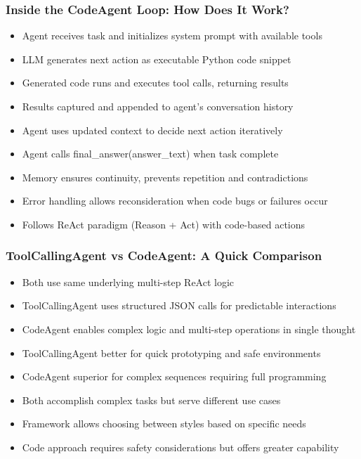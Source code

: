 \begin{frame}[fragile]\frametitle{Inside the CodeAgent Loop: How Does It Work?}
      \begin{itemize}
	\item Agent receives task and initializes system prompt with available tools
	\item LLM generates next action as executable Python code snippet
	\item Generated code runs and executes tool calls, returning results
	\item Results captured and appended to agent's conversation history
	\item Agent uses updated context to decide next action iteratively
	\item Agent calls final\_answer(answer\_text) when task complete
	\item Memory ensures continuity, prevents repetition and contradictions
	\item Error handling allows reconsideration when code bugs or failures occur
	\item Follows ReAct paradigm (Reason + Act) with code-based actions
	  \end{itemize}
\end{frame}

\begin{frame}[fragile]\frametitle{ToolCallingAgent vs CodeAgent: A Quick Comparison}
      \begin{itemize}
	\item Both use same underlying multi-step ReAct logic
	\item ToolCallingAgent uses structured JSON calls for predictable interactions
	\item CodeAgent enables complex logic and multi-step operations in single thought
	\item ToolCallingAgent better for quick prototyping and safe environments
	\item CodeAgent superior for complex sequences requiring full programming
	\item Both accomplish complex tasks but serve different use cases
	\item Framework allows choosing between styles based on specific needs
	\item Code approach requires safety considerations but offers greater capability
	  \end{itemize}
\end{frame}

